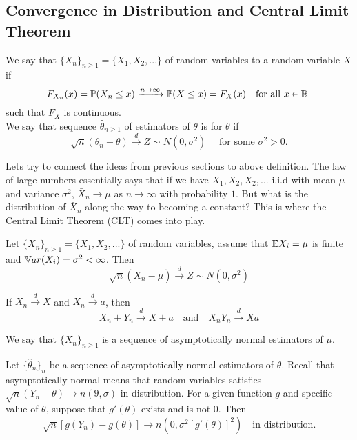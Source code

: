\subsection{Convergence in Distribution and Central Limit Theorem}
\begin{definition} 
    We say that $\{ X_n \}_{n \geq 1}  = \{ X_1,X_2,... \}$ of random variables  to a random variable $X$ if 
    $$
    F_{X_n}(x) = \mathbb P(X_n \leq x) \xrightarrow{n \to \infty} \mathbb P(X \leq x) = F_{X}(x) \quad \text{for all } x \in \mathbb R \
    $$
    such that $F_X$ is continuous.\\
    We say that sequence $\hat{\theta}_{n \geq 1}$ of estimators of $\theta$ is  for $\theta$ if 
    $$
    \sqrt{n}(\theta_n - \theta) \xrightarrow{d} Z \sim N(0,\sigma^2) \quad \text{ for some } \sigma^2 >0.
    $$
\end{definition}
Lets try to connect the ideas from previous sections to above definition. The law of large numbers essentially says that if we have $X_1,X_2,X_2,...$ i.i.d with mean $\mu$ and variance $\sigma^2$, $\bar{X}_n \to \mu$ as $n \to \infty$ with probability $1$. But what is the distribution of $\bar{X}_n$ along the way to becoming a constant? This is where the Central Limit Theorem (CLT) comes into play. 
\begin{theorem}
    Let $\{ X_n \}_{n \geq 1}  = \{ X_1,X_2,... \}$ of random variables, assume that $\mathbb E X_i = \mu$ is finite and $\mathbb V ar(X_i) = \sigma^2 < \infty$.
    Then 
    $$
    \sqrt{n}(\bar{X}_n - \mu) \xrightarrow{d} Z \sim N(0,\sigma^2)
    $$
\end{theorem}
\begin{theorem}
If $X_n \xrightarrow{d} X$ and $X_n \xrightarrow{d} a$, then
    $$
    X_n + Y_n \xrightarrow{d} X + a \quad \text{and} \quad
    X_nY_n \xrightarrow{d} Xa
    $$
\end{theorem}

We say that $\{ X_n \}_{n \geq 1}$ is a sequence of asymptotically normal estimators of $\mu$.
\begin{note}
     Let $\{ \hat{\theta}_n \}_n$ be a sequence of asymptotically normal estimators of $\theta$. Recall that asymptotically normal means that random variables satisfies $\sqrt{n}(Y_n - \theta) \to n(9,\sigma)$ in distribution. For a given function $g$ and specific value of $\theta$, suppose that $g'(\theta)$ exists and is not $0$. Then 
    $$
    \sqrt{n}[g(Y_n)-g(\theta)] \to n(0,\sigma^2[g'(\theta)]^2) \quad \text{in distribution.} 
    $$ 
    
\end{note}